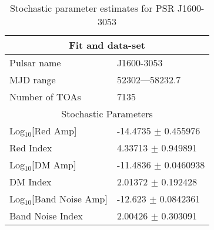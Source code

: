 \documentclass{article}
\begin{document}
\begin{table*}
\caption{Stochastic parameter estimates for PSR J1600-3053}
\begin{tabular}{ll}
\hline\hline
\multicolumn{2}{c}{Fit and data-set} \\ 
\hline
Pulsar name\dotfill & J1600-3053 \\ 
MJD range\dotfill & 52302---58232.7 \\ 
Number of TOAs\dotfill & 7135 \\
\hline
\multicolumn{2}{c}{Stochastic Parameters} \\ 
\hline
Log$_{10}$[Red Amp] \dotfill & -14.4735 $\pm$ 0.455976  \\ 
Red Index \dotfill & 4.33713 $\pm$ 0.949891  \\ 
Log$_{10}$[DM Amp] \dotfill & -11.4836 $\pm$ 0.0460938  \\ 
DM Index \dotfill & 2.01372 $\pm$ 0.192428  \\ 
Log$_{10}$[Band Noise Amp] \dotfill & -12.623 $\pm$ 0.0842361  \\ 
Band Noise Index \dotfill & 2.00426 $\pm$ 0.303091  \\ 
\hline
\end{tabular}
\label{Table:J1600-3053}
\end{table*} 
\end{document}
